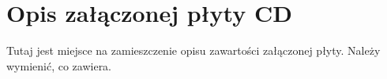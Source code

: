 \chapter{Opis załączonej płyty CD}
Tutaj jest miejsce na zamieszczenie opisu zawartości załączonej płyty.
Należy wymienić, co zawiera.